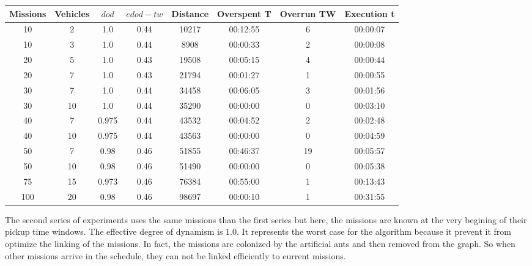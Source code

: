 \documentclass[a4paper,10pt]{article}
\begin{document}
\small
\begin{center}
  \begin{tabular}{|c|c|c|c|c|c|c|c|} 
\hline
\bf{Missions} & \bf{Vehicles} & \bf{$dod$} & \bf{$edod-tw$} & \bf{Distance} & \bf{Overspent T} & \bf{Overrun TW} &  \bf{Execution t} \\ \hline
10	 & 2 	& 1.0	& 0.44	& 10217	& 00:12:55	& 6	& 00:00:07\\
10	 & 3 	& 1.0	& 0.44	& 8908	& 00:00:33	& 2	& 00:00:08\\
20	 & 5 	& 1.0	& 0.43	& 19508	& 00:05:15	& 4	& 00:00:44\\
20	 & 7 	& 1.0	& 0.43	& 21794	& 00:01:27	& 1	& 00:00:55\\
30	 & 7 	& 1.0	& 0.44	& 34458	& 00:06:05	& 3	& 00:01:56\\
30	 & 10 	& 1.0	& 0.44	& 35290	& 00:00:00	& 0	& 00:03:10\\
40	 & 7 	& 0.975	& 0.44	& 43532	& 00:04:52	& 2	& 00:02:48\\
40	 & 10 	& 0.975	& 0.44	& 43563	& 00:00:00	& 0	& 00:04:59\\
50	 & 7 	& 0.98	& 0.46	& 51855	& 00:46:37	& 19	& 00:05:57\\
50	 & 10 	& 0.98	& 0.46	& 51490	& 00:00:00	& 0	& 00:05:38\\
75	 & 15 	& 0.973	& 0.46	& 76384	& 00:55:00	& 1	& 00:13:43\\
100	 & 20 	& 0.98	& 0.46	& 98697	& 00:00:10	& 1	& 00:31:55\\
\hline
\end{tabular}
\end{center}
\normalsize

The second series of experiments uses the same missions than the first series but here, the missions are known at the very begining of their pickup time windows. The effective degree of dynamism is $1.0$. It represents the worst case for the algorithm because it prevent it from optimize the linking of the missions. In fact, the missions are colonized by the artificial ants and then removed from the graph. So when other missions arrive in the schedule, they can not be linked efficiently to current missions.
\end{document}
